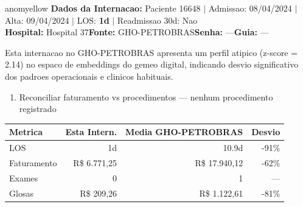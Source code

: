 \documentclass[a4paper,10pt]{article}
\begin{document}
\begin{anomalycard}[Internacao 86466 | GHO-PETROBRAS | MODERADO (z=2.14)]{anomyellow}
\textbf{Dados da Internacao:} Paciente 16648 $\mid$ Admissao: 08/04/2024 $\mid$ Alta: 09/04/2024 $\mid$ LOS: \textbf{1d} $\mid$ Readmissao 30d: Nao\\
\textbf{Hospital:} Hospital 37\quad\textbf{Fonte:} GHO-PETROBRAS\quad\textbf{Senha:} ---\quad\textbf{Guia:} ---\\
\vspace{2pt}\begin{tcolorbox}[colback=severityred!20,colframe=anomyellow,title={\textbf{Interpretacao de Negocio}},fonttitle=\bfseries\small,left=4pt,right=4pt,top=3pt,bottom=3pt]
{\small Esta internacao no GHO-PETROBRAS apresenta um perfil atipico (z-score = 2.14) no espaco de embeddings do gemeo digital, indicando desvio significativo dos padroes operacionais e clinicos habituais.}
\end{tcolorbox}
\begin{tcolorbox}[colback=severityyellow!30,colframe=anomorange,title={\textbf{Recomendacoes Especificas}},fonttitle=\bfseries\small,left=4pt,right=4pt,top=3pt,bottom=3pt]
\begin{enumerate}[nosep,leftmargin=16pt]
\item {\small Reconciliar faturamento vs procedimentos --- nenhum procedimento registrado}
\end{enumerate}
\end{tcolorbox}
\begin{center}\begin{tabular}{l r r r}\toprule\textbf{Metrica} & \textbf{Esta Intern.} & \textbf{Media GHO-PETROBRAS} & \textbf{Desvio} \\\midrule
LOS & 1d & 10.9d & -91\% \\
Faturamento & R\$ 6.771,25 & R\$ 17.940,12 & -62\% \\
Exames & 0 & 1 & --- \\
Glosas & R\$ 209,26 & R\$ 1.122,61 & -81\% \\
\bottomrule\end{tabular}\end{center}


\end{anomalycard}
\end{document}

